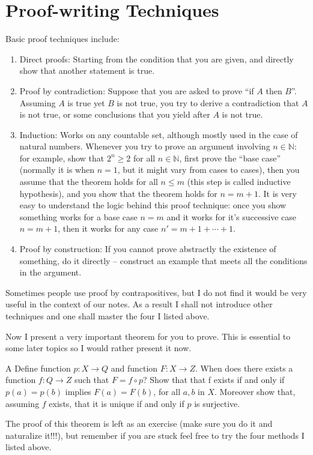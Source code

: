 \documentclass{article}
\newcommand{\N}{\mathbb{N}}
\begin{document}
\section*{Proof-writing Techniques}
Basic proof techniques include: 
\begin{enumerate}
    \item Direct proofs: Starting from the condition that you are given, and directly show that another statement is true. 
    \item Proof by contradiction: Suppose that you are asked to prove ``if $A$ then $B$''. Assuming $A$ is true yet $B$ is not true, you try to derive a contradiction that $A$ is not true, or some conclusions that you yield after $A$ is not true. 
    \item Induction: Works on any countable set, although mostly used in the case of natural numbers. Whenever you try to prove an argument involving $n \in \N$: for example, show that $2^n \geq 2$ for all $n \in \N$, first prove the ``base case'' (normally it is when $n = 1$, but it might vary from cases to cases), then you assume that the theorem holds for all $n \leq m$ (this step is called inductive hypothesis), and you show that the theorem holds for $n = m+1$. It is very easy to understand the logic behind this proof technique: once you show something works for a base case $n = m$ and it works for it's successive case $n = m+1$, then it works for any case $n' = m + 1 + \cdots + 1$. 
    \item Proof by construction: If you cannot prove abstractly the existence of something, do it directly -- construct an example that meets all the conditions in the argument. 
\end{enumerate}
Sometimes people use proof by contrapositives, but I do not find it would be very useful in the context of our notes. As a result I shall not introduce other techniques and one shall master the four I listed above. 

Now I present a very important theorem for you to prove. This is essential to some later topics so I would rather present it now. 

\begin{THRM}{A}
    Define function $p : X \to Q$ and function $F : X \to Z$. When does there exists a function
$f : Q \to Z$ such that $F = f \circ p$? Show that that f exists if and only if $p(a) = p(b)$ implies $F(a) = F(b)$,
for all $a, b$ in $X$. Moreover show that, assuming $f$ exists, that it is unique if and only if $p$ is surjective.
\end{THRM}

The proof of this theorem is left as an exercise (make sure you do it and naturalize it!!!), but remember if you are stuck feel free to try the four methods I listed above. 
\end{document}
